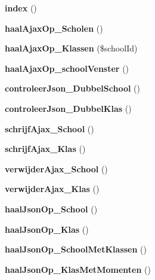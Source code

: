 \begin{DoxyCompactItemize}
\item 
\mbox{\label{class_school_a149eb92716c1084a935e04a8d95f7347}} 
{\bfseries index} ()
\item 
\mbox{\label{class_school_a762129fa78ec243b820a258ec890e2db}} 
{\bfseries haal\+Ajax\+Op\+\_\+\+Scholen} ()
\item 
\mbox{\label{class_school_a56b9e3f396a6e0301a817520b6b49d66}} 
{\bfseries haal\+Ajax\+Op\+\_\+\+Klassen} (\$school\+Id)
\item 
\mbox{\label{class_school_a27175998853b52b03b765702964f6f45}} 
{\bfseries haal\+Ajax\+Op\+\_\+school\+Venster} ()
\item 
\mbox{\label{class_school_a53505011cc10e00b4f063ebd628e974a}} 
{\bfseries controleer\+Json\+\_\+\+Dubbel\+School} ()
\item 
\mbox{\label{class_school_a486aa6607575e01779d460c29822cf75}} 
{\bfseries controleer\+Json\+\_\+\+Dubbel\+Klas} ()
\item 
\mbox{\label{class_school_a09f4fdffae9324b82b97a594c57a1a4d}} 
{\bfseries schrijf\+Ajax\+\_\+\+School} ()
\item 
\mbox{\label{class_school_a0c169354d6a9f90c2ea574b0ea35d1d3}} 
{\bfseries schrijf\+Ajax\+\_\+\+Klas} ()
\item 
\mbox{\label{class_school_a18c1abeb94d6f3851f7c922dc7ffbac0}} 
{\bfseries verwijder\+Ajax\+\_\+\+School} ()
\item 
\mbox{\label{class_school_ae2d10aa2dea9c482a9de10c84c3f12b1}} 
{\bfseries verwijder\+Ajax\+\_\+\+Klas} ()
\item 
\mbox{\label{class_school_a9d289c48811ea2bd5589769cf7571528}} 
{\bfseries haal\+Json\+Op\+\_\+\+School} ()
\item 
\mbox{\label{class_school_a6b30d4ee2b5e8fda79c937c707592d64}} 
{\bfseries haal\+Json\+Op\+\_\+\+Klas} ()
\item 
\mbox{\label{class_school_adfa992fb8b64ce9e1e1ae51baedfbbcc}} 
{\bfseries haal\+Json\+Op\+\_\+\+School\+Met\+Klassen} ()
\item 
\mbox{\label{class_school_a3fbe6de22ff1d8b31e03c300148341ca}} 
{\bfseries haal\+Json\+Op\+\_\+\+Klas\+Met\+Momenten} ()
\end{DoxyCompactItemize}
